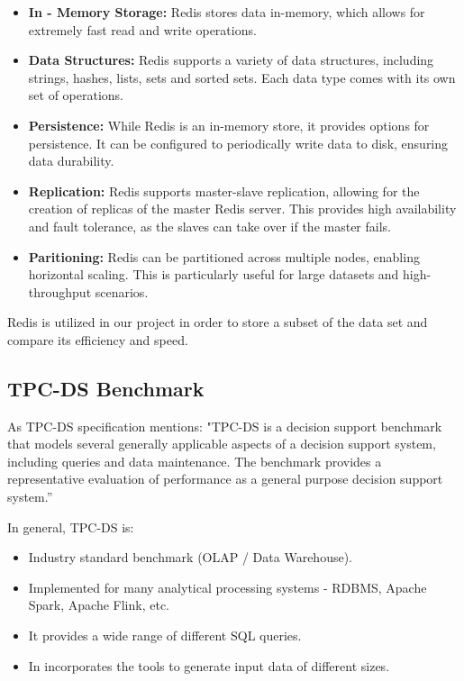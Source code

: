 \documentclass[conference]{IEEEtran}
\begin{document}
\begin{itemize}
    \item \textbf{In - Memory Storage:} Redis stores data in-memory, which allows for extremely fast read and write operations.
    \item \textbf{Data Structures:} Redis supports a variety of data structures, including strings, hashes, lists, sets and sorted sets. Each data type comes with its own set of operations.
    \item \textbf{Persistence:} While Redis is an in-memory store, it provides options for persistence. It can be configured to periodically write data to disk, ensuring data durability.
    \item \textbf{Replication:} Redis supports master-slave replication, allowing for the creation of replicas of the master Redis server.
          This provides high availability and fault tolerance, as the slaves can take over if the master fails.
    \item \textbf{Paritioning:} Redis can be partitioned across multiple nodes, enabling horizontal scaling. This is particularly useful for large datasets and high-throughput scenarios.
\end{itemize}

Redis is utilized in our project in order to store a subset of the data set and compare its efficiency and speed.

\subsection{TPC-DS Benchmark}
\label{sec:tpc-ds-benchmark}

As TPC-DS specification \cite{b8} mentions: "TPC-DS is a decision support benchmark that models several generally applicable
aspects of a decision support system, including queries and data maintenance. The benchmark provides a representative evaluation
of performance as a general purpose decision support system.”

In general, TPC-DS is:

\begin{itemize}
    \item Industry standard benchmark (OLAP / Data Warehouse).
    \item Implemented for many analytical processing systems - RDBMS, Apache Spark, Apache Flink, etc.
    \item It provides a wide range of different SQL queries.
    \item In incorporates the tools to generate input data of different sizes.
\end{itemize}
\end{document}
